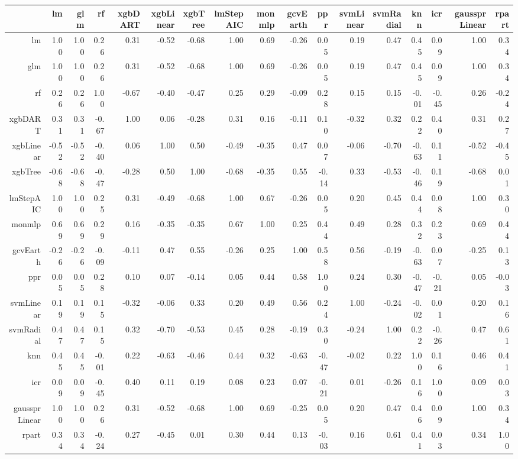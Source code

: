 \begin{table}[ht]
\centering
\begin{tabular}{rrrrrrrrrrrrrrrrr}
  \hline
 & lm & glm & rf & xgbDART & xgbLinear & xgbTree & lmStepAIC & monmlp & gcvEarth & ppr & svmLinear & svmRadial & knn & icr & gaussprLinear & rpart \\ 
  \hline
lm & 1.00 & 1.00 & 0.26 & 0.31 & -0.52 & -0.68 & 1.00 & 0.69 & -0.26 & 0.05 & 0.19 & 0.47 & 0.45 & 0.09 & 1.00 & 0.34 \\ 
  glm & 1.00 & 1.00 & 0.26 & 0.31 & -0.52 & -0.68 & 1.00 & 0.69 & -0.26 & 0.05 & 0.19 & 0.47 & 0.45 & 0.09 & 1.00 & 0.34 \\ 
  rf & 0.26 & 0.26 & 1.00 & -0.67 & -0.40 & -0.47 & 0.25 & 0.29 & -0.09 & 0.28 & 0.15 & 0.15 & -0.01 & -0.45 & 0.26 & -0.24 \\ 
  xgbDART & 0.31 & 0.31 & -0.67 & 1.00 & 0.06 & -0.28 & 0.31 & 0.16 & -0.11 & 0.10 & -0.32 & 0.32 & 0.22 & 0.40 & 0.31 & 0.27 \\ 
  xgbLinear & -0.52 & -0.52 & -0.40 & 0.06 & 1.00 & 0.50 & -0.49 & -0.35 & 0.47 & 0.07 & -0.06 & -0.70 & -0.63 & 0.11 & -0.52 & -0.45 \\ 
  xgbTree & -0.68 & -0.68 & -0.47 & -0.28 & 0.50 & 1.00 & -0.68 & -0.35 & 0.55 & -0.14 & 0.33 & -0.53 & -0.46 & 0.19 & -0.68 & 0.01 \\ 
  lmStepAIC & 1.00 & 1.00 & 0.25 & 0.31 & -0.49 & -0.68 & 1.00 & 0.67 & -0.26 & 0.05 & 0.20 & 0.45 & 0.44 & 0.08 & 1.00 & 0.30 \\ 
  monmlp & 0.69 & 0.69 & 0.29 & 0.16 & -0.35 & -0.35 & 0.67 & 1.00 & 0.25 & 0.44 & 0.49 & 0.28 & 0.32 & 0.23 & 0.69 & 0.44 \\ 
  gcvEarth & -0.26 & -0.26 & -0.09 & -0.11 & 0.47 & 0.55 & -0.26 & 0.25 & 1.00 & 0.58 & 0.56 & -0.19 & -0.63 & 0.07 & -0.25 & 0.13 \\ 
  ppr & 0.05 & 0.05 & 0.28 & 0.10 & 0.07 & -0.14 & 0.05 & 0.44 & 0.58 & 1.00 & 0.24 & 0.30 & -0.47 & -0.21 & 0.05 & -0.03 \\ 
  svmLinear & 0.19 & 0.19 & 0.15 & -0.32 & -0.06 & 0.33 & 0.20 & 0.49 & 0.56 & 0.24 & 1.00 & -0.24 & -0.02 & 0.01 & 0.20 & 0.16 \\ 
  svmRadial & 0.47 & 0.47 & 0.15 & 0.32 & -0.70 & -0.53 & 0.45 & 0.28 & -0.19 & 0.30 & -0.24 & 1.00 & 0.22 & -0.26 & 0.47 & 0.61 \\ 
  knn & 0.45 & 0.45 & -0.01 & 0.22 & -0.63 & -0.46 & 0.44 & 0.32 & -0.63 & -0.47 & -0.02 & 0.22 & 1.00 & 0.16 & 0.46 & 0.41 \\ 
  icr & 0.09 & 0.09 & -0.45 & 0.40 & 0.11 & 0.19 & 0.08 & 0.23 & 0.07 & -0.21 & 0.01 & -0.26 & 0.16 & 1.00 & 0.09 & 0.03 \\ 
  gaussprLinear & 1.00 & 1.00 & 0.26 & 0.31 & -0.52 & -0.68 & 1.00 & 0.69 & -0.25 & 0.05 & 0.20 & 0.47 & 0.46 & 0.09 & 1.00 & 0.34 \\ 
  rpart & 0.34 & 0.34 & -0.24 & 0.27 & -0.45 & 0.01 & 0.30 & 0.44 & 0.13 & -0.03 & 0.16 & 0.61 & 0.41 & 0.03 & 0.34 & 1.00 \\ 
   \hline
\end{tabular}
\end{table}

